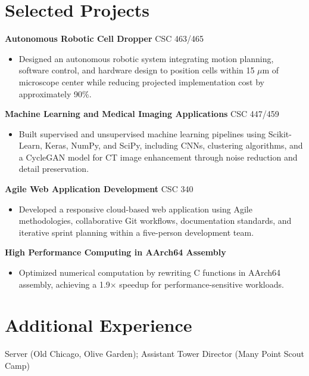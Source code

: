 \documentclass[10pt]{article}
\begin{document}
\section*{Selected Projects}


\textbf{Autonomous Robotic Cell Dropper} \hfill CSC 463/465

\begin{itemize}
\item Designed an autonomous robotic system integrating motion planning, software control, and hardware design to position cells within 15 $\mu$m of microscope center while reducing projected implementation cost by approximately 90\%.
\end{itemize}


\textbf{Machine Learning and Medical Imaging Applications}
\hfill CSC 447/459

\begin{itemize}

\item Built supervised and unsupervised machine learning pipelines using Scikit-Learn, Keras, NumPy, and SciPy, including CNNs, clustering algorithms, and a CycleGAN model for CT image enhancement through noise reduction and detail preservation.

\end{itemize}


\textbf{Agile Web Application Development}
\hfill CSC 340

\begin{itemize}

\item Developed a responsive cloud-based web application using Agile methodologies, collaborative Git workflows, documentation standards, and iterative sprint planning within a five-person development team.

\end{itemize}


\textbf{High Performance Computing in AArch64 Assembly}

\begin{itemize}
\item Optimized numerical computation by rewriting C functions in AArch64 assembly, achieving a 1.9$\times$ speedup for performance-sensitive workloads.
\end{itemize}
\vspace{-7pt}


\section*{Additional Experience}

Server (Old Chicago, Olive Garden); Assistant Tower Director (Many Point Scout Camp)

\vspace{-7pt}
\end{document}
